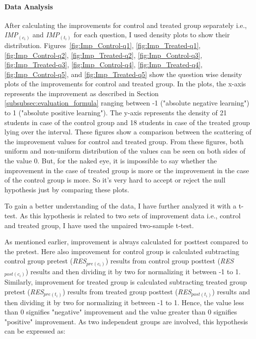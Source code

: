 \paragraph{Data Analysis}
After calculating the improvements for control and treated group separately i.e., \textit{IMP$_{(c_i)}$} and \textit{IMP$_{(t_i)}$} for each question, I used density plots to show their distribution. Figures~\ref{fig:Imp_Control-q1}, \ref{fig:Imp_Treated-q1}, \ref{fig:Imp_Control-q2}, \ref{fig:Imp_Treated-q2}, \ref{fig:Imp_Control-q3}, \ref{fig:Imp_Treated-q3}, \ref{fig:Imp_Control-q4}, \ref{fig:Imp_Treated-q4}, \ref{fig:Imp_Control-q5}, and \ref{fig:Imp_Treated-q5} show the question wise density plots of the improvements for control and treated group. In the plots, the x-axis represents the improvement as described in Section \ref{subsubsec:evaluation_formula} ranging between -1 ("absolute negative learning") to 1 ("absolute positive learning"). The y-axis represents the density of 21 students in case of the control group and 18 students in case of the treated group lying over the interval. These figures show a comparison between the scattering of the improvement values for control and treated group. From these figures, both uniform and non-uniform distribution of the values can be seen on both sides of the value 0. But, for the naked eye, it is impossible to say whether the improvement in the case of treated group is more or the improvement in the case of the control group is more. So it's very hard to accept or reject the null hypothesis just by comparing these plots.

To gain a better understanding of the data, I have further analyzed it with a t-test. As this hypothesis is related to two sets of improvement data i.e., control and treated group, I have used the unpaired two-sample t-test.   

As mentioned earlier, improvement is always calculated for posttest compared to the pretest. Here also improvement for control group is calculated subtracting control group pretest (\textit{RES$_{pre(c_i)}$}) results from control group posttest (\textit{RES$_{post(c_i)}$}) results and then dividing it by two for normalizing it between -1 to 1. Similarly, improvement for treated group is calculated subtracting treated group pretest (\textit{RES$_{pre(t_i)}$}) results from treated group posttest (\textit{RES$_{post(t_i)}$}) results and then dividing it by two for normalizing it between -1 to 1. Hence, the value less than 0 signifies "negative" improvement and the value greater than 0 signifies "positive" improvement. As two independent groups are involved, this hypothesis can be expressed as:   

